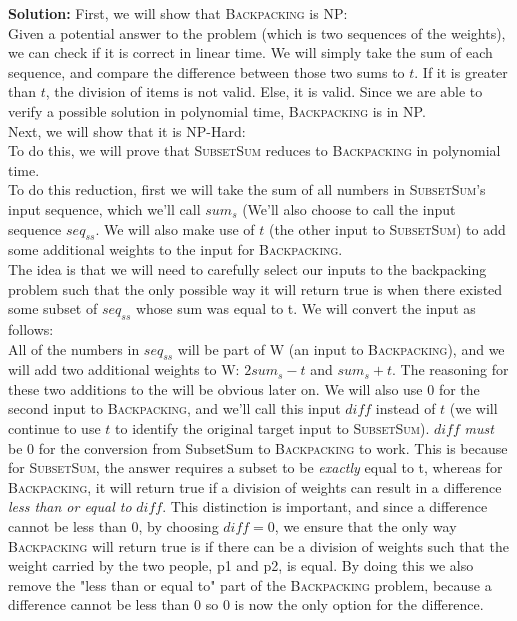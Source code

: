\documentclass[10pt]{article}
\newcommand{\solution}[1]{\color{blue}\hfill\break\noindent\textbf{Solution:} #1\color{black}}
\begin{document}
\begin{enumerate}
  \solution{
    First, we will show that \textsc{Backpacking} is NP: \\
    Given a potential answer to the problem (which is two sequences of the weights), we can check if it is correct in linear time. We will simply take the sum of each sequence, and compare the difference between those two sums to $t$. If it is greater than $t$, the division of items is not valid. Else, it is valid. Since we are able to verify a possible  solution in polynomial time, \textsc{Backpacking} is in NP. \\
    Next, we will show that it is NP-Hard: \\
    To do this, we will prove that \textsc{SubsetSum} reduces to \textsc{Backpacking} in polynomial time. \\
    To do this reduction, first we will take the sum of all numbers in \textsc{SubsetSum}'s input sequence, which we'll call $sum_s$ (We'll also choose to call the input sequence $seq_{ss}$. We will also make use of $t$ (the other input to \textsc{SubsetSum}) to add some additional weights to the input for \textsc{Backpacking}. \\ The idea is that we will need to carefully select our inputs to the backpacking problem such that the only possible way it will return true is when there existed some subset of $seq_{ss}$ whose sum was equal to t. We will convert the input as follows: \\
    All of the numbers in $seq_{ss}$ will be part of W (an input to \textsc{Backpacking}), and we will add two additional weights to W: $2sum_s - t$ and $sum_s + t$. The reasoning for these two additions to the will be obvious later on. We will also use $0$ for the second input to \textsc{Backpacking}, and we'll call this input $diff$ instead of $t$ (we will continue to use $t$ to identify the original target input to \textsc{SubsetSum}). $diff$ \emph{must} be $0$ for the conversion from SubsetSum to \textsc{Backpacking} to work. This is because for \textsc{SubsetSum}, the answer requires a subset to be \emph{exactly} equal to t, whereas for \textsc{Backpacking}, it will return true if a division of weights can result in a difference \emph{less than or equal to} $diff$. This distinction is important, and since a difference cannot be less than $0$, by choosing $diff = 0$, we ensure that the only way \textsc{Backpacking} will return true is if there can be a division of weights such that the weight carried by the two people, p1 and p2, is equal. By doing this we also remove the "less than or equal to" part of the \textsc{Backpacking} problem, because a difference cannot be less than $0$ so $0$ is now the only option for the difference. \\
}
\end{enumerate}
\end{document}

